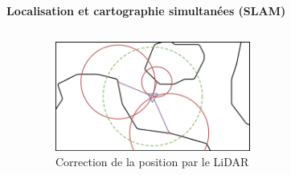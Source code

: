\documentclass[aspectratio=169,10pt]{beamer}
\begin{document}
\begin{frame}{\textbf{Localisation et cartographie simultanées (SLAM)}}
\begin{columns}[t]
\begin{column}{0.5\textwidth}
		\end{column}
		\begin{column}{0.5\textwidth}
			\begin{figure}
				\centering
				\includegraphics[width=0.6\textwidth]{IMAGES/lidar_correct_pos.png}
				\caption{Correction de la position par le LiDAR}
			\end{figure}
		\end{column}
	\end{columns}
		
\end{frame}
\end{document}
